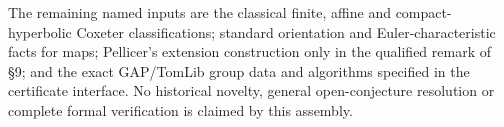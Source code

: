 \documentclass[
  11pt,
  a4paper,
]{article}
\begin{document}
The remaining named inputs are the classical finite, affine and
compact-hyperbolic Coxeter classifications; standard orientation and
Euler-characteristic facts for maps; Pellicer's extension construction
only in the qualified remark of §9; and the exact GAP/TomLib group data
and algorithms specified in the certificate interface. No historical
novelty, general open-conjecture resolution or complete formal
verification is claimed by this assembly.
\end{document}
